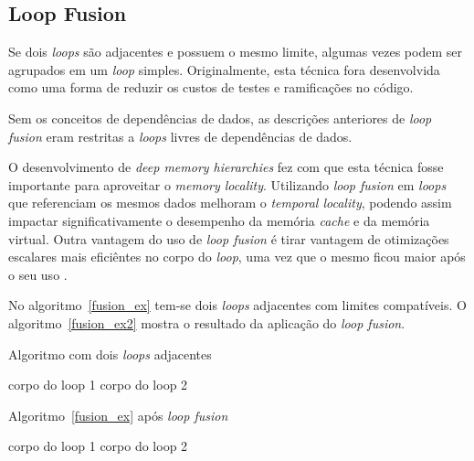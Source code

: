 
\subsection{Loop Fusion}

Se dois \textit{loops} são adjacentes e possuem o mesmo limite, algumas vezes
podem ser agrupados em um \textit{loop} simples.
Originalmente, esta técnica fora desenvolvida como uma forma de reduzir os
custos de testes e ramificações no código.

Sem os conceitos de dependências de dados, as descrições anteriores de
\textit{loop fusion} eram restritas a \textit{loops} livres de dependências de
dados. 

O desenvolvimento de \textit{deep memory hierarchies} fez com que esta técnica
fosse importante para aproveitar o \textit{memory locality}.
Utilizando \textit{loop fusion} em \textit{loops} que referenciam os mesmos
dados melhoram o \textit{temporal locality}, podendo assim impactar 
significativamente o desempenho da memória \textit{cache} e da memória virtual.
Outra vantagem do uso de \textit{loop fusion} é tirar vantagem de otimizações 
escalares mais eficiêntes no corpo do \textit{loop}, uma vez que o mesmo ficou
maior após o seu uso \cite{hpcfpc}.

No algoritmo~\ref{fusion_ex} tem-se dois \textit{loops} adjacentes com limites
compatíveis. 
O algoritmo~\ref{fusion_ex2} mostra o resultado da aplicação do 
\textit{loop fusion}.

\begin{algorithm}
\caption{Algoritmo com dois \textit{loops} adjacentes}
\label{fusion_ex}
\begin{algorithmic}[1]

\STATE corpo do loop 1
\ENDFOR
{}
\STATE corpo do loop 2
\ENDFOR

\end{algorithmic}
\end{algorithm}

\begin{algorithm}
\caption{Algoritmo~\ref{fusion_ex} após \textit{loop fusion}}
\label{fusion_ex2}
\begin{algorithmic}[1]

\STATE corpo do loop 1
\STATE corpo do loop 2
\ENDFOR

\end{algorithmic}
\end{algorithm}

